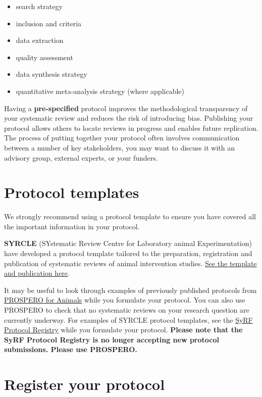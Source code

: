 \documentclass[
]{book}
\providecommand{\tightlist}{%
  \setlength{\itemsep}{0pt}\setlength{\parskip}{0pt}}
\begin{document}
\begin{itemize}
\tightlist
\item
  search strategy
\item
  inclusion and criteria
\item
  data extraction
\item
  quality assessment
\item
  data synthesis strategy
\item
  quantitative meta-analysis strategy (where applicable)
\end{itemize}

Having a \textbf{pre-specified} protocol improves the methodological transparency of your systematic review and reduces the risk of introducing bias. Publishing your protocol allows others to locate reviews in progress and enables future replication. The process of putting together your protocol often involves communication between a number of key stakeholders, you may want to discuss it with an advisory group, external experts, or your funders.

\hypertarget{protocol-templates}{%
\section{Protocol templates}\label{protocol-templates}}

We strongly recommend using a protocol template to ensure you have covered all the important information in your protocol.

\textbf{SYRCLE} (SYstematic Review Centre for Laboratory animal Experimentation) have developed a protocol template tailored to the preparation, registration and publication of systematic reviews of animal intervention studies. \href{https://onlinelibrary.wiley.com/doi/epdf/10.1002/ebm2.7}{See the template and publication here}.

It may be useful to look through examples of previously published protocols from \href{https://www.crd.york.ac.uk/prospero/\#searchadvanced}{PROSPERO for Animals} while you formulate your protocol. You can also use PROSPERO to check that no systematic reviews on your research question are currently underway. For examples of SYRCLE protocol templates, see the \href{https://syrf.org.uk/protocols/}{SyRF Protocol Registry} while you formulate your protocol. \textbf{Please note that the SyRF Protocol Registry is no longer accepting new protocol submissions. Please use PROSPERO.}

\hypertarget{register-your-protocol}{%
\section{Register your protocol}\label{register-your-protocol}}
\end{document}
